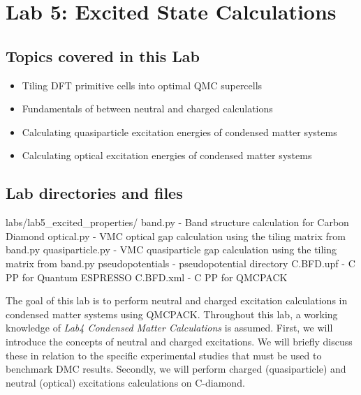 \chapter{Lab 5: Excited State Calculations}
\label{chap:excited}


\section{Topics covered in this Lab}
\begin{itemize}
	\item{Tiling DFT primitive cells into optimal QMC supercells}
	\item{Fundamentals of  between neutral and charged calculations}
	\item{Calculating quasiparticle excitation energies of condensed matter systems}
	\item{Calculating optical excitation energies of condensed matter systems}
\end{itemize}

\section{Lab directories and files}

\begin{shade}
labs/lab5_excited_properties/
    band.py           - Band structure calculation for Carbon Diamond
    optical.py        - VMC optical gap calculation using the tiling matrix from band.py
    quasiparticle.py  - VMC quasiparticle gap calculation using the tiling matrix from band.py
pseudopotentials      - pseudopotential directory
	C.BFD.upf         - C PP for Quantum ESPRESSO
	C.BFD.xml         - C PP for QMCPACK
\end{shade}

The goal of this lab is to perform neutral and charged excitation calculations in condensed matter systems using QMCPACK. 
Throughout this lab, a working knowledge of \textit{Lab4 Condensed Matter Calculations} is assumed. 
First, we will introduce the concepts of neutral and charged excitations. 
We will briefly discuss these in relation to the specific experimental studies that must be used to benchmark DMC results. 
Secondly, we will perform charged (quasiparticle) and neutral (optical) excitations calculations on C-diamond.

